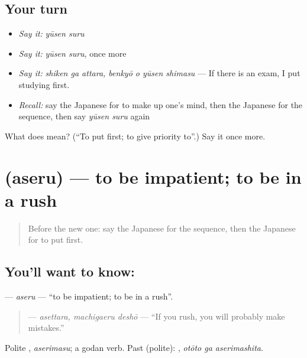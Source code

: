 \subsection*{Your turn}
\begin{itemize}
\raggedright
  \item \emph{Say it:} \emph{yūsen suru}
  \item \emph{Say it:} \emph{yūsen suru}, once more
  \item \emph{Say it:} \emph{shiken ga attara, benkyō o yūsen shimasu} — If there is an exam, I put studying first.
  \item \emph{Recall:} say the Japanese for to make up one's mind, then the Japanese for the sequence, then say \emph{yūsen suru} again
\end{itemize}

\begin{tcolorbox}[breakable,colback=teal!4,colframe=teal!35!black,title={Before you move on}]
What does  mean? (\textquotedblleft{}To put first; to give priority to\textquotedblright{}.) Say it once more.
\end{tcolorbox}
\section[\texorpdfstring{\ja{あせる} (aseru)}{あせる (aseru)}]{ (aseru) — to be impatient; to be in a rush}

\label{lesson:JA-C366-aseru}



\begin{quote}
Before the new one: say the Japanese for the sequence, then the Japanese for to put first.
\end{quote}

\subsection*{You'll want to know: }
\textbf{} — \emph{aseru} — \textquotedblleft{}to be impatient; to be in a rush\textquotedblright{}.

\begin{quote}
\textbf{} — \emph{asettara, machigaeru deshō} — \textquotedblleft{}If you rush, you will probably make mistakes.\textquotedblright{}
\end{quote}

Polite \textbf{}, \emph{aserimasu}; a godan verb. Past (polite): \textbf{ }, \emph{otōto ga aserimashita}.

